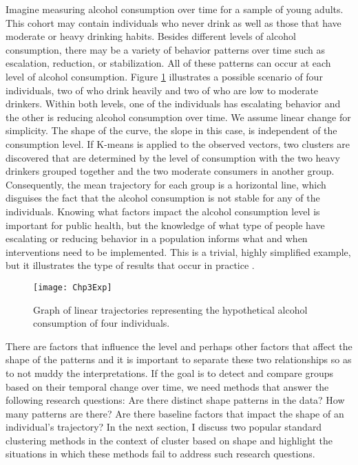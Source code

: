 Imagine measuring alcohol consumption over time for a sample of young adults. This cohort may contain individuals who never drink as well as those that have moderate or heavy drinking habits. Besides different levels of alcohol consumption, there may be a variety of behavior patterns over time such as escalation, reduction, or stabilization. All of these patterns can occur at each level of alcohol consumption. Figure \ref{fig:3-1} illustrates a possible scenario of four individuals, two of who drink heavily and two of who are low to moderate drinkers. Within both levels, one of the individuals has escalating behavior and the other is reducing alcohol consumption over time. We assume linear change for simplicity. The shape of the curve, the slope in this case, is independent of the consumption level. If K-means is applied to the observed vectors, two clusters are discovered that are determined by the level of consumption with the two heavy drinkers grouped together and the two moderate consumers in another group. Consequently, the mean trajectory for each group is a horizontal line, which disguises the fact that the alcohol consumption is not stable for any of the individuals. Knowing what factors impact the alcohol consumption level is important for public health, but the knowledge of what type of people have escalating or reducing behavior in a population informs what and when interventions need to be implemented. This is a trivial, highly simplified example, but it illustrates the type of results that occur in practice \cite{mccoy2010}.

\begin{figure}[ht]
\centering
\texttt{[image: Chp3Exp]}
\caption{Graph of linear trajectories representing the hypothetical alcohol consumption of four individuals.}
\label{fig:3-1}
\end{figure}

There are factors that influence the level and perhaps other factors that affect the shape of the patterns and it is important to separate these two relationships so as to not muddy the interpretations. If the goal is to detect and compare groups based on their temporal change over time, we need methods that answer the following research questions: Are there distinct shape patterns in the data? How many patterns are there? Are there baseline factors that impact the shape of an individual's trajectory? In the next section, I discuss two popular standard clustering methods in the context of cluster based on shape and highlight the situations in which these methods fail to address such research questions. 

